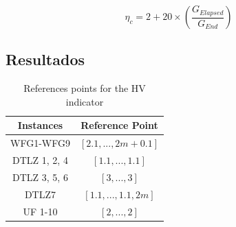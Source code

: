 \begin{equation}\label{eqn:index_eta}
 \eta_c = 2 + 20 \times \left ( \frac{G_{Elapsed}}{G_{End}} \right)
\end{equation}

\subsection{Resultados}

\begin{table}[t]
\centering
\scriptsize
\caption{References points for the HV indicator}
\label{tab:ReferencePoints}
\begin{tabular}{cc}
\hline
\textbf{Instances} & \textbf{Reference Point} \\ \hline
WFG1-WFG9 & $[2.1, ...,2m+0.1]$ \\
DTLZ 1, 2, 4 & $[1.1, ..., 1.1]$ \\
DTLZ 3, 5, 6 & $[3, ..., 3]$ \\
DTLZ7 & $[1.1, ..., 1.1, 2m]$ \\
UF 1-10 & $[2, ..., 2]$ \\ \hline
\end{tabular}
\end{table}


